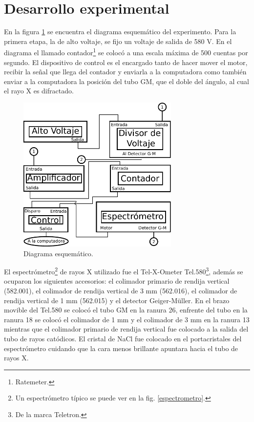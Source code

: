 \documentclass[letterpaper,10pt,twocolumn]{article}
\numberwithin{equation}{section}
\begin{document}
\section{Desarrollo experimental}
\label{sec:desarr}

En la figura \ref{fig:dispositivo} se encuentra el diagrama esquemático del experimento. Para
la primera etapa, la de alto voltaje, se fijo un voltaje de salida de 580 V. En el diagrama el
llamado contador\footnote{Ratemeter.} se colocó a una escala máxima de 500 cuentas por 
segundo. El dispositivo de control es el encargado tanto de hacer mover el motor, recibir la
señal que llega del contador y enviarla a la computadora como también enviar a la computadora
la posición del tubo GM, que el doble del ángulo, al cual el rayo X es difractado. 

\begin{figure}[H]
  \centering
  \includegraphics[width=8cm]{dispositivo}
  \caption{Diagrama esquemático.}
  \label{fig:dispositivo}
\end{figure}

El espectrómetro\footnote{Un espectrómetro típico se puede ver en la
  fig. \ref{espectrometro}.} de rayos X utilizado fue el Tel-X-Ometer Tel.580\footnote{De la
  marca Teletron.}, además se ocuparon los siguientes accesorios: el colimador primario de
rendija vertical (582.001), el colimador de rendija vertical de 3 mm (562.016), el colimador
de rendija vertical de 1 mm (562.015) y el detector Geiger-Müller. En el brazo movible del
Tel.580 se colocó el tubo GM en la ranura 26, enfrente del tubo en la ranura 18 se colocó el
colimador de 1 mm y el colimador de 3 mm en la ranura 13 mientras que el  colimador primario
de rendija vertical fue colocado a la salida del tubo de rayos catódicos. El cristal de NaCl
fue colocado en el portacristales del espectrómetro cuidando que la cara menos brillante
apuntara hacia el tubo de rayos X. 
\end{document}
